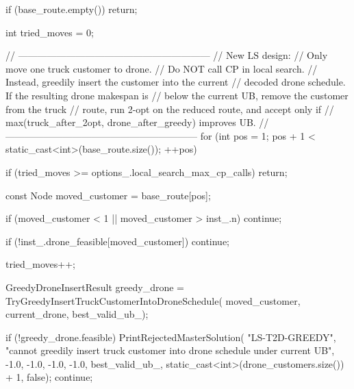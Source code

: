 {{{{                if (base_route.empty())
                {
                    return;
                }

                int tried_moves = 0;

                // ------------------------------------------------------------
                // New LS design:
                //   Only move one truck customer to drone.
                //   Do NOT call CP in local search.
                //   Instead, greedily insert the customer into the current
                //   decoded drone schedule. If the resulting drone makespan is
                //   below the current UB, remove the customer from the truck
                //   route, run 2-opt on the reduced route, and accept only if
                //   max(truck_after_2opt, drone_after_greedy) improves UB.
                // ------------------------------------------------------------
                for (int pos = 1; pos + 1 < static_cast<int>(base_route.size()); ++pos)
                {
                    if (tried_moves >= options_.local_search_max_cp_calls)
                    {
                        return;
                    }

                    const Node moved_customer = base_route[pos];

                    if (moved_customer < 1 || moved_customer > inst_.n)
                    {
                        continue;
                    }

                    if (!inst_.drone_feasible[moved_customer])
                    {
                        continue;
                    }

                    tried_moves++;

                    GreedyDroneInsertResult greedy_drone =
                        TryGreedyInsertTruckCustomerIntoDroneSchedule(
                            moved_customer,
                            current_drone,
                            best_valid_ub_);

                    if (!greedy_drone.feasible)
                    {
                        PrintRejectedMasterSolution(
                            "LS-T2D-GREEDY",
                            "cannot greedily insert truck customer into drone schedule under current UB",
                            -1.0,
                            -1.0,
                            -1.0,
                            -1.0,
                            best_valid_ub_,
                            static_cast<int>(drone_customers.size()) + 1,
                            false);
                        continue;
                    }

}}}}}
